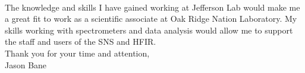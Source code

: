 \documentclass[12pt,letterpaper]{article}
\begin{document}
\paragraph{}The knowledge and skills I have gained working at Jefferson Lab would make me a great fit to work as a scientific associate at Oak Ridge Nation Laboratory. My skills working with spectrometers and data analysis would allow me to support the staff and users of the SNS and HFIR.
\\

\noindent Thank you for your time and attention,\\
\noindent Jason Bane
\end{document}
